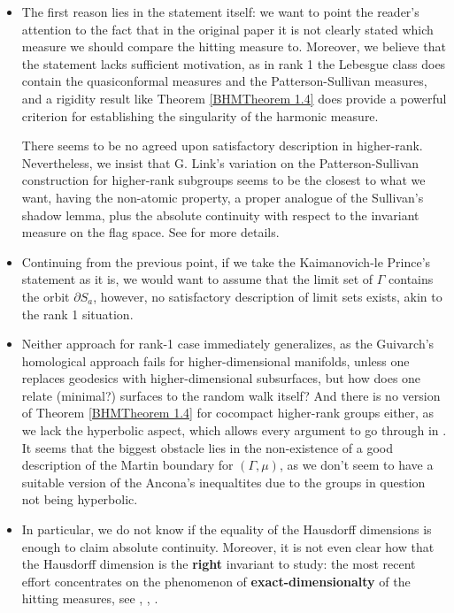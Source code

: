 \documentclass[11pt]{amsart}
\theoremstyle{definition}
\begin{document}
	\begin{itemize}
		\item The first reason lies in the statement itself: we want to point the reader's attention to the fact that in the original paper it is not clearly stated which measure we should compare the hitting measure to. Moreover, we believe that the statement lacks sufficient motivation, as in rank 1 the Lebesgue class does contain the quasiconformal measures and the Patterson-Sullivan measures, and a rigidity result like Theorem \ref{BHMTheorem 1.4} does provide a powerful criterion for establishing the singularity of the harmonic measure.
		
		There seems to be no agreed upon satisfactory description in higher-rank. Nevertheless, we insist that G. Link's variation on the Patterson-Sullivan construction for higher-rank subgroups seems to be the closest to what we want, having the non-atomic property, a proper analogue of the Sullivan's shadow lemma, plus the absolute continuity with respect to the invariant measure on the flag space. See \cite{linkhausdorff} for more details.
		\item Continuing from the previous point, if we take the Kaimanovich-le Prince's statement as it is, we would want to assume that the limit set of $\Gamma$ contains the orbit $\partial S_a$, however, no satisfactory description of limit sets exists, akin to the rank 1 situation.
		\item Neither approach for rank-1 case immediately generalizes, as the Guivarch's homological approach fails for higher-dimensional manifolds, unless one replaces geodesics with higher-dimensional subsurfaces, but how does one relate (minimal?) surfaces to the random walk itself? And there is no version of Theorem \ref{BHMTheorem 1.4} for cocompact higher-rank groups either, as we lack the hyperbolic aspect, which allows every argument to go through in \cite{blachere2011harmonic}. It seems that the biggest obstacle lies in the non-existence of a good description of the Martin boundary for $(\Gamma, \mu)$, as we don't seem to have a suitable version of the Ancona's inequaltites due to the groups in question not being hyperbolic.
		\item In particular, we do not know if the equality of the Hausdorff dimensions is enough to claim absolute continuity. Moreover, it is not even clear how that the Hausdorff dimension is the \textbf{right} invariant to study: the most recent effort concentrates on the phenomenon of \textbf{exact-dimensionalty} of the hitting measures, see \cite{kaimanovich2011matrix}, \cite{lessaledrappier1}, \cite{ledrappier2023exact}. 

\end{itemize}
\end{document}

